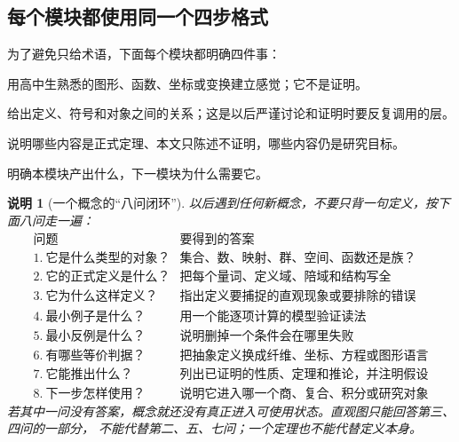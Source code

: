 \documentclass[UTF8,fontset=none,a4paper,11pt]{ctexart}
\theoremstyle{foundation-definition}
\theoremstyle{foundation-theorem}
\theoremstyle{foundation-proposition}
\theoremstyle{foundation-example}
\theoremstyle{foundation-remark}
\newtheorem{remark}[definition]{说明}
\theoremstyle{foundation-theorem}
\begin{document}
\clearpage
\subsection{每个模块都使用同一个四步格式}

为了避免只给术语，下面每个模块都明确四件事：

\begin{description}[style=nextline,leftmargin=2.8cm]
  \item[直观入口]
  用高中生熟悉的图形、函数、坐标或变换建立感觉；它不是证明。
  \item[正式对象]
  给出定义、符号和对象之间的关系；这是以后严谨讨论和证明时要反复调用的层。
  \item[定理边界]
  说明哪些内容是正式定理、本文只陈述不证明，哪些内容仍是研究目标。
  \item[交接接口]
  明确本模块产出什么，下一模块为什么需要它。
\end{description}

\begin{remark}[一个概念的“八问闭环”]
以后遇到任何新概念，不要只背一句定义，按下面八问走一遍：
\[
\begin{array}{c|c}
\text{问题}&\text{要得到的答案}\\
\hline
1.\ \text{它是什么类型的对象？}&\text{集合、数、映射、群、空间、函数还是族？}\\
2.\ \text{它的正式定义是什么？}&\text{把每个量词、定义域、陪域和结构写全}\\
3.\ \text{它为什么这样定义？}&\text{指出定义要捕捉的直观现象或要排除的错误}\\
4.\ \text{最小例子是什么？}&\text{用一个能逐项计算的模型验证读法}\\
5.\ \text{最小反例是什么？}&\text{说明删掉一个条件会在哪里失败}\\
6.\ \text{有哪些等价判据？}&\text{把抽象定义换成纤维、坐标、方程或图形语言}\\
7.\ \text{它能推出什么？}&\text{列出已证明的性质、定理和推论，并注明假设}\\
8.\ \text{下一步怎样使用？}&\text{说明它进入哪一个商、复合、积分或研究对象}
\end{array}
\]
若其中一问没有答案，概念就还没有真正进入可使用状态。直观图只能回答第三、四问的一部分，
不能代替第二、五、七问；一个定理也不能代替定义本身。
\end{remark}
\end{document}
